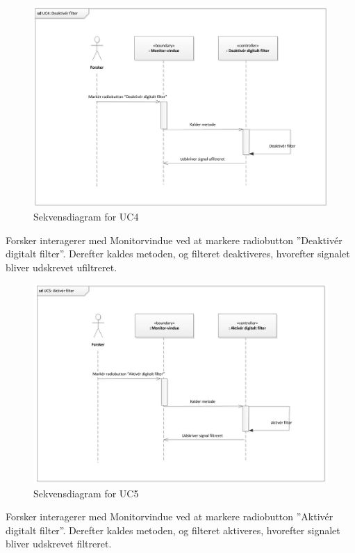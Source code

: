 \begin{figure}[H]
	\centering
	\includegraphics[width=1\textwidth]{Figurer/Snip20151104_34}
	\caption{Sekvensdiagram for UC4}
\end{figure}

Forsker interagerer med Monitorvindue ved at markere radiobutton ”Deaktivér digitalt filter”. Derefter kaldes metoden, og filteret deaktiveres, hvorefter signalet bliver udskrevet ufiltreret.

\begin{figure}[H]
	\centering
	\includegraphics[width=1\textwidth]{Figurer/Snip20151104_35}
	\caption{Sekvensdiagram for UC5}
\end{figure}

Forsker interagerer med Monitorvindue ved at markere radiobutton ”Aktivér digitalt filter”. Derefter kaldes metoden, og filteret aktiveres, hvorefter signalet bliver udskrevet filtreret.

